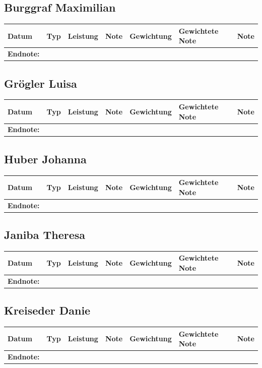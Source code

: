 \documentclass[11pt]{article}
\begin{document}
\subsection{Burggraf Maximilian}
\label{sec:org7f50cf5}
\begin{center}
\begin{tabular}{lllllll}
Datum & Typ & Leistung & Note & Gewichtung & Gewichtete Note & Note\\
\hline
\hline
\textbf{Endnote:} &  &  &  &  &  & \\
\end{tabular}
\end{center}
\subsection{Grögler Luisa}
\label{sec:orgebcf4c7}
\begin{center}
\begin{tabular}{lllllll}
Datum & Typ & Leistung & Note & Gewichtung & Gewichtete Note & Note\\
\hline
\hline
\textbf{Endnote:} &  &  &  &  &  & \\
\end{tabular}
\end{center}
\subsection{Huber Johanna}
\label{sec:org1a80cc3}
\begin{center}
\begin{tabular}{lllllll}
Datum & Typ & Leistung & Note & Gewichtung & Gewichtete Note & Note\\
\hline
\hline
\textbf{Endnote:} &  &  &  &  &  & \\
\end{tabular}
\end{center}
\subsection{Janiba Theresa}
\label{sec:orga69a49f}
\begin{center}
\begin{tabular}{lllllll}
Datum & Typ & Leistung & Note & Gewichtung & Gewichtete Note & Note\\
\hline
\hline
\textbf{Endnote:} &  &  &  &  &  & \\
\end{tabular}
\end{center}
\subsection{Kreiseder Danie}
\label{sec:org9cbfb82}
\begin{center}
\begin{tabular}{lllllll}
Datum & Typ & Leistung & Note & Gewichtung & Gewichtete Note & Note\\
\hline
\hline
\textbf{Endnote:} &  &  &  &  &  & \\
\end{tabular}
\end{center}
\end{document}
